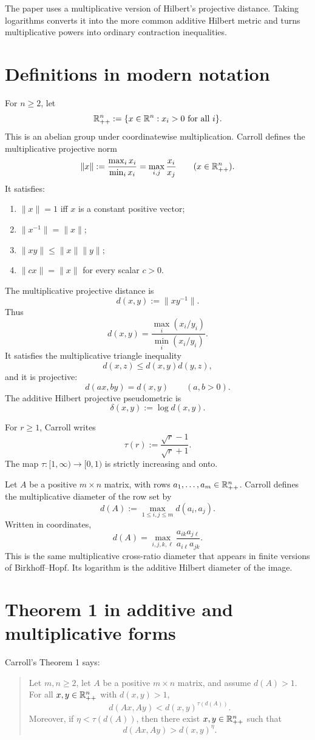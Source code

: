 The paper uses a multiplicative version of Hilbert's projective distance.  Taking
logarithms converts it into the more common additive Hilbert metric and turns
multiplicative powers into ordinary contraction inequalities.

\section*{Definitions in modern notation}
For $n\ge2$, let
\[
  \mathbb{R}^n_{++}:=\{x\in\mathbb{R}^n:x_i>0\text{ for all }i\}.
\]
This is an abelian group under coordinatewise multiplication.  Carroll defines the
multiplicative projective norm
\[
  \|x\|:=\frac{\max_i x_i}{\min_i x_i}
        =\max_{i,j}\frac{x_i}{x_j}
  \qquad (x\in\mathbb{R}^n_{++}).
\]
It satisfies:
\begin{enumerate}[leftmargin=2em]
\item $\|x\|=1$ iff $x$ is a constant positive vector;
\item $\|x^{-1}\|=\|x\|$;
\item $\|xy\|\le \|x\|\|y\|$;
\item $\|cx\|=\|x\|$ for every scalar $c>0$.
\end{enumerate}
The multiplicative projective distance is
\[
  d(x,y):=\|xy^{-1}\|.
\]
Thus
\[
  d(x,y)=\frac{\max_i(x_i/y_i)}{\min_i(x_i/y_i)}.
\]
It satisfies the multiplicative triangle inequality
\[
  d(x,z)\le d(x,y)d(y,z),
\]
and it is projective:
\[
  d(ax,by)=d(x,y)\qquad(a,b>0).
\]
The additive Hilbert projective pseudometric is
\[
  \delta(x,y):=\log d(x,y).
\]

For $r\ge1$, Carroll writes
\[
  \tau(r):=\frac{\sqrt r-1}{\sqrt r+1}.
\]
The map $\tau:[1,\infty)\to[0,1)$ is strictly increasing and onto.

Let $A$ be a positive $m\times n$ matrix, with rows $a_1,\dots,a_m\in\mathbb{R}^n_{++}$.
Carroll defines the multiplicative diameter of the row set by
\[
  d(A):=\max_{1\le i,j\le m}d(a_i,a_j).
\]
Written in coordinates,
\[
  d(A)=\max_{i,j,k,\ell}\frac{a_{ik}a_{j\ell}}{a_{i\ell}a_{jk}}.
\]
This is the same multiplicative cross-ratio diameter that appears in finite versions
of Birkhoff--Hopf.  Its logarithm is the additive Hilbert diameter of the image.

\section*{Theorem 1 in additive and multiplicative forms}
Carroll's Theorem 1 says:

\begin{quote}
Let $m,n\ge2$, let $A$ be a positive $m\times n$ matrix, and assume $d(A)>1$.
For all $x,y\in\mathbb{R}^n_{++}$ with $d(x,y)>1$,
\[
  d(Ax,Ay)<d(x,y)^{\tau(d(A))}.
\]
Moreover, if $\eta<\tau(d(A))$, then there exist $x,y\in\mathbb{R}^n_{++}$ such that
\[
  d(Ax,Ay)>d(x,y)^\eta.
\]
\end{quote}

